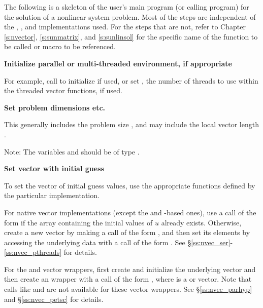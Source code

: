 The following is a skeleton of the user's main program (or calling
program) for the solution of a nonlinear system problem.
Most of the steps are independent of the {\nvector}, {\sunmatrix}, and {\sunlinsol}
implementations used.
For the steps that are not, refer to Chapter \ref{s:nvector},
\ref{s:sunmatrix}, and \ref{s:sunlinsol}  for the
specific name of the function to be called or macro to be referenced.
\begin{Steps}

\item
  {\bf Initialize parallel or multi-threaded environment, if appropriate}

  For example, call  to initialize {\mpi} if used, or
  set , the number of threads to use within the threaded
  vector functions, if used.

\item
  {\bf Set problem dimensions etc.}

  This generally includes the problem size , and may include
  the local vector length .

  Note: The variables  and  should be of type .

\item
  {\bf Set vector with initial guess}

  To set the vector  of initial guess values, use the appropriate
  functions defined by the particular {\nvector} implementation.

  For native {\sundials} vector implementations
  (except the {\cuda} and {\raja}-based ones), use a call
  of the form  if the  array
   containing the initial values of $u$ already exists.
  Otherwise, create a new vector by making a call of the form
  , and then set its elements by accessing
  the underlying data with a call of the form
  .
  See \S\ref{ss:nvec_ser}-\ref{ss:nvec_pthreads} for details.

  For the {\hypre} and {\petsc} vector wrappers, first create and initialize
  the underlying vector and then create an {\nvector} wrapper with a call
  of the form , where  is a {\hypre}
  or {\petsc} vector. Note that calls like  and
   are not available for these vector wrappers.
  See \S\ref{ss:nvec_parhyp} and \S\ref{ss:nvec_petsc} for details.


\end{Steps}
